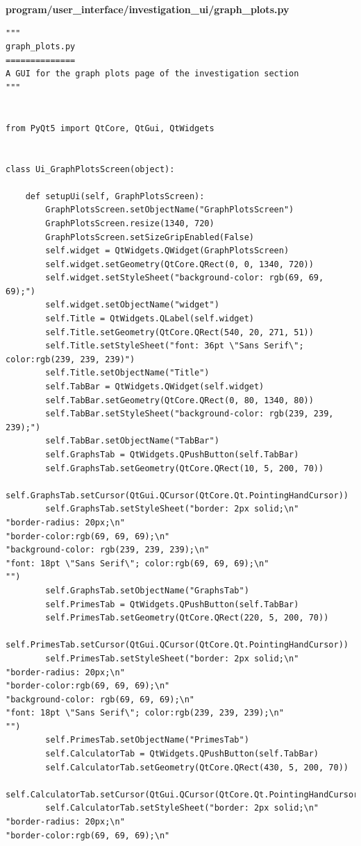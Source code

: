 \documentclass{article}
\begin{document}
\textbf{program/user\_interface/investigation\_ui/graph\_plots.py}
\begin{lstlisting}
"""
graph_plots.py
==============
A GUI for the graph plots page of the investigation section
"""


from PyQt5 import QtCore, QtGui, QtWidgets


class Ui_GraphPlotsScreen(object):

    def setupUi(self, GraphPlotsScreen):
        GraphPlotsScreen.setObjectName("GraphPlotsScreen")
        GraphPlotsScreen.resize(1340, 720)
        GraphPlotsScreen.setSizeGripEnabled(False)
        self.widget = QtWidgets.QWidget(GraphPlotsScreen)
        self.widget.setGeometry(QtCore.QRect(0, 0, 1340, 720))
        self.widget.setStyleSheet("background-color: rgb(69, 69, 69);")
        self.widget.setObjectName("widget")
        self.Title = QtWidgets.QLabel(self.widget)
        self.Title.setGeometry(QtCore.QRect(540, 20, 271, 51))
        self.Title.setStyleSheet("font: 36pt \"Sans Serif\"; color:rgb(239, 239, 239)")
        self.Title.setObjectName("Title")
        self.TabBar = QtWidgets.QWidget(self.widget)
        self.TabBar.setGeometry(QtCore.QRect(0, 80, 1340, 80))
        self.TabBar.setStyleSheet("background-color: rgb(239, 239, 239);")
        self.TabBar.setObjectName("TabBar")
        self.GraphsTab = QtWidgets.QPushButton(self.TabBar)
        self.GraphsTab.setGeometry(QtCore.QRect(10, 5, 200, 70))
        self.GraphsTab.setCursor(QtGui.QCursor(QtCore.Qt.PointingHandCursor))
        self.GraphsTab.setStyleSheet("border: 2px solid;\n"
"border-radius: 20px;\n"
"border-color:rgb(69, 69, 69);\n"
"background-color: rgb(239, 239, 239);\n"
"font: 18pt \"Sans Serif\"; color:rgb(69, 69, 69);\n"
"")
        self.GraphsTab.setObjectName("GraphsTab")
        self.PrimesTab = QtWidgets.QPushButton(self.TabBar)
        self.PrimesTab.setGeometry(QtCore.QRect(220, 5, 200, 70))
        self.PrimesTab.setCursor(QtGui.QCursor(QtCore.Qt.PointingHandCursor))
        self.PrimesTab.setStyleSheet("border: 2px solid;\n"
"border-radius: 20px;\n"
"border-color:rgb(69, 69, 69);\n"
"background-color: rgb(69, 69, 69);\n"
"font: 18pt \"Sans Serif\"; color:rgb(239, 239, 239);\n"
"")
        self.PrimesTab.setObjectName("PrimesTab")
        self.CalculatorTab = QtWidgets.QPushButton(self.TabBar)
        self.CalculatorTab.setGeometry(QtCore.QRect(430, 5, 200, 70))
        self.CalculatorTab.setCursor(QtGui.QCursor(QtCore.Qt.PointingHandCursor))
        self.CalculatorTab.setStyleSheet("border: 2px solid;\n"
"border-radius: 20px;\n"
"border-color:rgb(69, 69, 69);\n"

\end{lstlisting}
\end{document}
